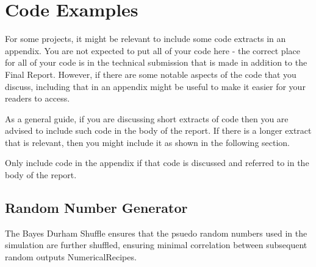\chapter{Code Examples}

For some projects, it might be relevant to include some code extracts in an appendix. You are not expected to put all of your code here - the correct place for all of your code is in the technical submission that is made in addition to the Final Report. However, if there are some notable aspects of the code that you discuss, including that in an appendix might be useful to make it easier for your readers to access. 

As a general guide, if you are discussing short extracts of code then you are advised to include such code in the body of the report. If there is a longer extract that is relevant, then you might include it as shown in the following section. 

Only include code in the appendix if that code is discussed and referred to in the body of the report. 

\section{Random Number Generator}

The Bayes Durham Shuffle ensures that the psuedo random numbers used in the simulation are further shuffled, ensuring minimal correlation between subsequent random outputs NumericalRecipes.

